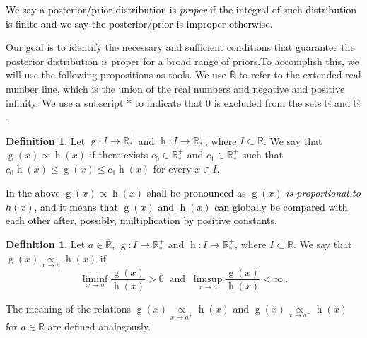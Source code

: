 \documentclass[]{interact}
\newcommand{\f}{\operatorname}
\theoremstyle{plain}%
\theoremstyle{definition}
\newtheorem{definition}[theorem]{Definition}
\theoremstyle{remark}
\begin{document}

\textcolor{black}{We say a posterior/prior distribution is \textit{proper} if the integral of such distribution is finite and we say the posterior/prior is improper otherwise.}

Our goal is to identify the necessary and sufficient conditions that guarantee the posterior distribution is proper for a broad range of priors.To accomplish this, we will use the following propositions as tools. We use $\overline{\mathbb{R}}$ to refer to the extended real number line, which is the union of the real numbers and negative and positive infinity. We use a subscript $*$ to indicate that $0$ is excluded from the sets $\mathbb{R}$ and $\overline{\mathbb{R}}$.

\begin{definition}\label{definition0} Let $\f{g}:I\to\overline{\mathbb{R}}_*^+$ and $\f{h}:I\to\overline{\mathbb{R}}_*^+$, where $I\subset\mathbb{R}$. We say that $\f{g}(x)\propto \f{h}(x)$ if there exists $c_0\in \mathbb{R}^+_*$ and $c_1\in \mathbb{R}^+_*$ such that $c_0\f{h}(x) \leq \f{g}(x) \leq c_1\f{h}(x)$ for every $x\in I$.
\end{definition}

\textcolor{black}{In the above $\f{g}(x)\propto \f{h}(x)$ shall be pronounced as $\f{g}(x)$ \textit{is proportional to} $h(x)$, and it means that $\f{g}(x)$ and $\f{h}(x)$ can globally be compared with each other after, possibly, multiplication by positive constants.}

\begin{definition}\label{definition1}
Let $a\in \mathbb{\overline{R}}$, $\f{g}:I\to\mathbb{R^+_*}$ and $\f{h}:I\to\mathbb{R^+_*}$, where $I\subset\mathbb{R}$. We say that $\f{g}(x)\underset{x\to a}{\propto} \f{h}(x)$ if
\begin{equation*}
\liminf_{x\to a} \frac{\f{g}(x)}{\f{h}(x)} > 0\ \mbox{ and }\ \limsup_{x\to a} \frac{\f{g}(x)}{\f{h}(x)} < \infty  \,.
\end{equation*}
\end{definition}
The meaning of the relations $\f{g}(x)\underset{x\to a^+}{\propto} \f{h}(x)$ and $\f{g}(x)\underset{x\to a^-}{\propto} \f{h}(x)$ for $a\in \mathbb{R}$ are defined analogously.
\end{document}
